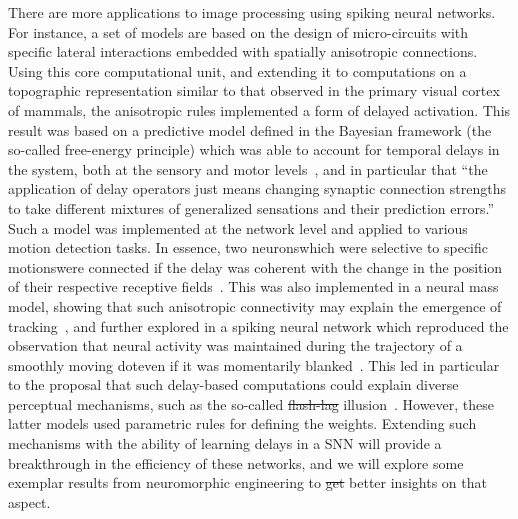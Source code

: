 \documentclass[brainsci, %
               review,accept,pdftex,moreauthors %
               ]{Definitions/mdpi}
\providecommand{\DIFadd}[1]{{\protect\color{blue}\uwave{#1}}} %
\providecommand{\DIFdel}[1]{{\protect\color{red}\sout{#1}}}                      %
\providecommand{\DIFaddbegin}{} %
\providecommand{\DIFaddend}{} %
\providecommand{\DIFdelbegin}{} %
\providecommand{\DIFdelend}{} %
\newcommand{\DIFscaledelfig}{0.5}
\newlength{\DIFdelgraphicswidth} %
\newlength{\DIFdelgraphicsheight} %
\newcommand{\DIFaddincludegraphics}[2][]{{\color{blue}\fbox{\DIFOincludegraphics[#1]{#2}}}} %
\newcommand{\DIFdelincludegraphics}[2][]{%
\sbox{\DIFdelgraphicsbox}{\DIFOincludegraphics[#1]{#2}}%
\settoboxwidth{\DIFdelgraphicswidth}{\DIFdelgraphicsbox} %
\settoboxtotalheight{\DIFdelgraphicsheight}{\DIFdelgraphicsbox} %
\scalebox{\DIFscaledelfig}{%
\parbox[b]{\DIFdelgraphicswidth}{\usebox{\DIFdelgraphicsbox}\\[-\baselineskip] \rule{\DIFdelgraphicswidth}{0em}}\llap{\resizebox{\DIFdelgraphicswidth}{\DIFdelgraphicsheight}{%
\setlength{\unitlength}{\DIFdelgraphicswidth}%
\begin{picture}(1,1)%
\thicklines\linethickness{2pt} %
{\color[rgb]{1,0,0}\put(0,0){\framebox(1,1){}}}%
{\color[rgb]{1,0,0}\put(0,0){\line( 1,1){1}}}%
{\color[rgb]{1,0,0}\put(0,1){\line(1,-1){1}}}%
\end{picture}%
}\hspace*{3pt}}} %
} %
\DeclareRobustCommand{\DIFaddbegin}{\DIFOaddbegin \let\includegraphics\DIFaddincludegraphics} %
\DeclareRobustCommand{\DIFaddend}{\DIFOaddend \let\includegraphics\DIFOincludegraphics} %
\DeclareRobustCommand{\DIFdelbegin}{\DIFOdelbegin \let\includegraphics\DIFdelincludegraphics} %
\DeclareRobustCommand{\DIFdelend}{\DIFOaddend \let\includegraphics\DIFOincludegraphics} %
\begin{document}
There are more applications to image processing using spiking neural networks. For instance, a set of models are based on the design of micro-circuits with specific lateral interactions embedded with spatially anisotropic connections. Using this core computational unit, and extending it to computations on a topographic representation similar to that observed in the primary visual cortex of mammals, the anisotropic rules implemented a form of delayed activation. This result was based on a predictive model defined in the Bayesian framework (the so-called free-energy principle) which was able to account for temporal delays in the  system, both at the sensory and motor levels~\citep{perrinet_active_2014}, and in particular that ``the application of delay operators just means changing synaptic connection strengths to take different mixtures of generalized sensations and their prediction errors.'' Such a model was implemented at the network level and applied to various motion detection tasks. In essence, two neurons\DIFaddbegin \DIFadd{, }\DIFaddend which were selective to specific motions\DIFaddbegin \DIFadd{, }\DIFaddend were connected if the delay was coherent with the change in the position of their respective receptive fields~\citep{hogendoorn_predictive_2019}.  This was also implemented in a neural mass model, showing that such anisotropic connectivity may explain the emergence of tracking~\citep{khoei_motion-based_2013}, and further explored in a spiking neural network which reproduced the observation that neural activity was maintained during the trajectory of a smoothly moving dot\DIFaddbegin \DIFadd{, }\DIFaddend even if it was momentarily blanked~\citep{kaplan_anisotropic_2013}. This led in particular to the proposal that such delay-based computations could explain diverse perceptual mechanisms, such as the so-called \DIFdelbegin \DIFdel{flash-lag }\DIFdelend \DIFaddbegin \DIFadd{flash--lag }\DIFaddend illusion~\citep{khoei_flash-lag_2017}. However, these latter models used parametric rules for defining the weights. Extending such mechanisms with the ability of learning delays in a SNN will provide a breakthrough in the efficiency of these networks, and we will explore some exemplar results from neuromorphic engineering to \DIFdelbegin \DIFdel{get }\DIFdelend \DIFaddbegin \DIFadd{obtain }\DIFaddend better insights on that aspect.
%
\end{document}
